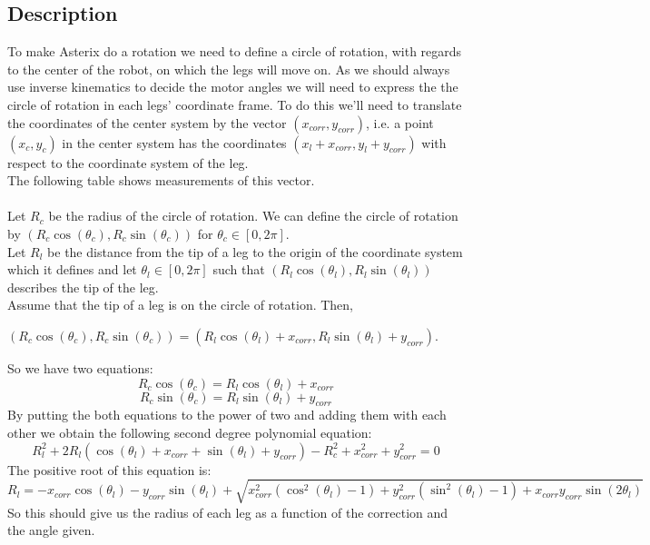 \documentclass[11pt, a4paper]{article}
\newcommand{\coord}[2]{\left(#1,#2\right)}
\begin{document}
\subsection{Description}
To make Asterix do a rotation we need to define a circle of rotation, with regards to the center of the robot, on which the legs will move on.
As we should always use inverse kinematics to decide the motor angles we will need to express the the circle of rotation in each legs' coordinate frame. To do this we'll need to translate the coordinates of the center system by the vector $(x_{corr}, y_{corr})$, i.e. a point $\left(x_c,y_c\right)$ in the center system has the coordinates $\left(x_l + x_{corr},y_l+y_{corr}\right)$ with respect to the coordinate system of the leg.\\ 
The following table shows measurements of this vector. \\
\vspace{0.5cm}
\\
Let $R_c$ be the radius of the circle of rotation. We can define the circle of rotation by $\left(R_c \cos(\theta_c), R_c \sin(\theta_c)\right)$ for $\theta_c \in \left[0,2\pi\right]$.\\
Let $R_l$ be the distance from the tip of a leg to the origin of the coordinate system which it defines and let $\theta_l \in \left[0,2\pi\right]$ such that $\left(R_l \cos(\theta_l), R_l \sin(\theta_l)\right)$ describes the tip of the leg.\\
Assume that the tip of a leg is on the circle of rotation. Then, \\
\begin{center}
$\coord{R_c\cos(\theta_c)}{R_c\sin(\theta_c)} = \coord{R_l\cos(\theta_l)+x_{corr}}{R_l\sin(\theta_l)+y_{corr}}$.
\end{center}
So we have two equations:
\begin{equation}
R_c\cos(\theta_c) = R_l\cos(\theta_l)+x_{corr}
\end{equation}
\begin{equation}
R_c\sin(\theta_c) = R_l\sin(\theta_l)+y_{corr}
\end{equation}
By putting the both equations to the power of two and adding them with each other we obtain the following second degree polynomial equation:
\begin{equation*}
R_l^2 + 2R_l\left(\cos(\theta_l)+x_{corr}+\sin(\theta_l)+y_{corr}\right) - R_c^2 + x_{corr}^2 + y_{corr}^2 = 0
\end{equation*}
The positive root of this equation is:
\begin{equation*}
R_l = -x_{corr}\cos(\theta_l)-y_{corr}\sin(\theta_l)+\sqrt{x_{corr}^2\left(\cos^2(\theta_l)-1\right) + y_{corr}^2\left(\sin^2(\theta_l)-1\right)+x_{corr}y_{corr}\sin(2\theta_l)}
\end{equation*} 
So this should give us the radius of each leg as a function of the correction and the angle given.
\clearpage
\end{document}
